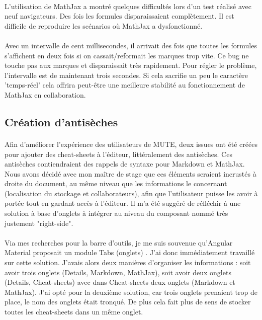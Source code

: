 \documentclass[12pt]{article}
\begin{document}
\paragraph{}
L'utilisation de MathJax a montré quelques difficultés lors d'un test réalisé avec neuf navigateurs. Des fois les formules disparaissaient complètement. Il est difficile de reproduire les scénarios où MathJax a dysfonctionné.
\paragraph{}
Avec un intervalle de cent millisecondes, il arrivait des fois que toutes les formules s'affichent en deux fois si on cassait/reformait les marques trop vite. Ce bug ne touche pas aux marques et disparaissait très rapidement. Pour régler le problème, l'intervalle est de maintenant trois secondes. Si cela sacrifie un peu le caractère 'temps-réel' cela offrira peut-être une meilleure stabilité au fonctionnement de MathJax en collaboration.

\newpage
\subsection{Création d'antisèches}
\paragraph{}
Afin d'améliorer l'expérience des utilisateurs de MUTE, deux issues ont été créées pour ajouter des cheat-sheets à l'éditeur, littéralement des antisèches. Ces antisèches contiendraient des rappels de syntaxe pour Markdown et MathJax. Nous avons décidé avec mon maître de stage que ces éléments seraient incrustés à droite du document, au même niveau que les informations le concernant (localisation du stockage et collaborateurs), afin que l'utilisateur puisse les avoir à portée tout en gardant accès à l'éditeur. Il m'a été suggéré de réfléchir à une solution à base d'onglets à intégrer au niveau du composant nommé très justement "right-side".
\paragraph{}
Via mes recherches pour la barre d'outils, je me suis souvenue qu'Angular Material proposait un module Tabs (onglets) \cite{tabs}. J'ai donc immédiatement travaillé sur cette solution. J'avais alors deux manières d'organiser les informations : soit avoir trois onglets (Details, Markdown, MathJax), soit avoir deux onglets (Details, Cheat-sheets) avec dans Cheat-sheets deux onglets (Markdown et MathJax). J'ai opté pour la deuxième solution, car trois onglets prenaient trop de place, le nom des onglets était tronqué. De plus cela fait plus de sens de stocker toutes les cheat-sheets dans un même onglet.\\
\end{document}
